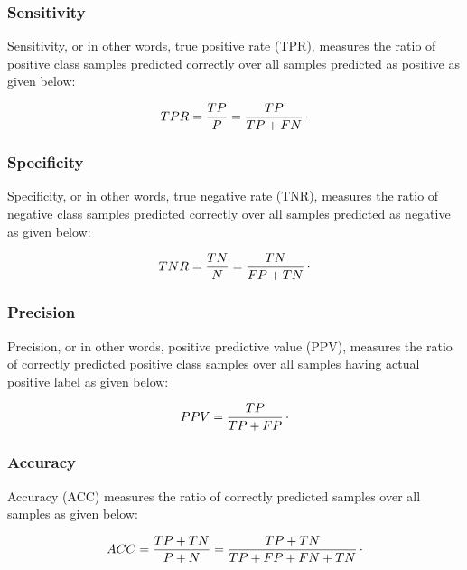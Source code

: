 \subsubsection*{Sensitivity}

Sensitivity, or in other words, true positive rate (TPR), measures the ratio of positive class samples predicted correctly over all samples predicted as positive as given below:

\begin{equation}
\label{eq:TPR}
    TPR = \frac{TP}{P} = \frac{TP}{TP + FN}\raisepunct{.}
\end{equation}

\subsubsection*{Specificity}

Specificity, or in other words, true negative rate (TNR),  measures the ratio of negative class samples predicted correctly over all samples predicted as negative as given below:

\begin{equation}
\label{eq:TNR}
    TNR = \frac{TN}{N} = \frac{TN}{FP + TN}\raisepunct{.}
\end{equation}

\subsubsection*{Precision}

Precision, or in other words, positive predictive value (PPV), measures the ratio of correctly predicted positive class samples over all samples having actual positive label as given below:

\begin{equation}
\label{eq:PPV}
    PPV = \frac{TP}{TP + FP}\raisepunct{.}
\end{equation}

\subsubsection*{Accuracy}

Accuracy (ACC) measures the ratio of correctly predicted samples over all samples as given below:

\begin{equation}
\label{eq:ACC}
    ACC = \frac{TP + TN}{P + N} = \frac{TP + TN}{TP + FP + FN + TN}\raisepunct{.}
\end{equation}

